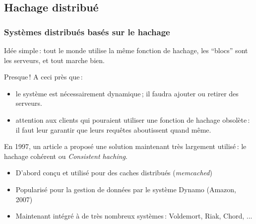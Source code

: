 \subsection{Hachage distribué}


\begin{frame}
\frametitle{Systèmes distribués basés sur le hachage}

Idée simple\,: tout le monde utilise la même fonction de hachage, les ``blocs''
sont les serveurs, et tout marche bien.

\vfill

\alert{Presque\,!} A ceci près que\,:

\begin{itemize}
  \item le système est nécessairement \alert{dynamique}\,; il faudra ajouter ou retirer
  des serveurs.

\item attention aux clients qui pouraient utiliser une fonction de hachage \alert{obsolète}\,: il faut
   leur garantir que leurs requêtes aboutissent quand même.
   
\end{itemize}

\vfill

En 1997, un article a proposé une solution maintenant très largement utilisé\,: le
\alert{hachage cohérent} ou \textit{Consistent haching}.


\begin{itemize}
  \item D'abord conçu et utilisé pour des \alert{caches distribués} (\textit{memcached})

  \item Popularisé pour la gestion de données par le système Dynamo (Amazon, 2007)

  \item Maintenant intégré à de très nombreux systèmes\,: Voldemort, Riak, Chord, ...
 
\end{itemize}
\end{frame}

